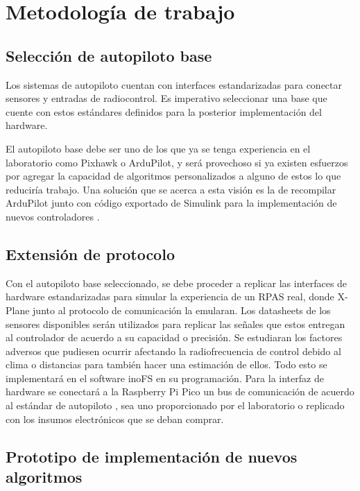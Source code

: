 \section{Metodología de trabajo}

\subsection{Selección de autopiloto base}

Los sistemas de autopiloto cuentan con interfaces estandarizadas para conectar sensores y entradas de radiocontrol. Es imperativo seleccionar una base que cuente con estos estándares definidos para la posterior implementación del hardware.

El autopiloto base debe ser uno de los que ya se tenga experiencia en el laboratorio como Pixhawk o ArduPilot, y será provechoso si ya existen esfuerzos por agregar la capacidad de algoritmos personalizados a alguno de estos lo que reduciría trabajo. Una solución que se acerca a esta visión es la de recompilar ArduPilot junto con código exportado de Simulink para la implementación de nuevos controladores \cite{ardupilot-custom}.

\subsection{Extensión de protocolo}

Con el autopiloto base seleccionado, se debe proceder a replicar las interfaces de hardware estandarizadas para simular la experiencia de un RPAS real, donde X-Plane junto al protocolo de comunicación la emularan. Los datasheets de los sensores disponibles serán utilizados para replicar las señales que estos entregan al controlador de acuerdo a su capacidad o precisión. Se estudiaran los factores adversos que pudiesen ocurrir afectando la radiofrecuencia de control debido al clima o distancias para también hacer una estimación de ellos. Todo esto se implementará en el software inoFS \cite{inofs} en su programación. Para la interfaz de hardware se conectará a la Raspberry Pi Pico un bus de comunicación de acuerdo al estándar de autopiloto \cite{px4-bus}, sea uno proporcionado por el laboratorio o replicado con los insumos electrónicos que se deban comprar.

\subsection{Prototipo de implementación de nuevos algoritmos}

